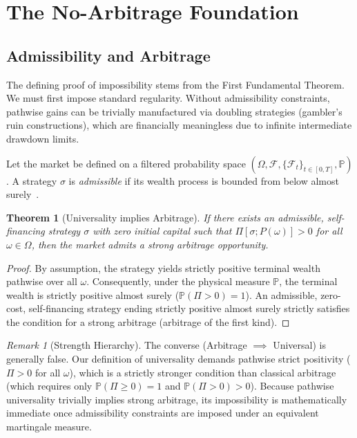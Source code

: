 \documentclass[aps,pra,reprint,superscriptaddress,amsmath,amssymb]{revtex4-2}
\theoremstyle{plain}
\newtheorem{theorem}{Theorem}
\theoremstyle{definition}
\theoremstyle{remark}
\newtheorem{remark}{Remark}
\begin{document}
\section{The No-Arbitrage Foundation}
\label{sec:noarb}

\subsection{Admissibility and Arbitrage}

The defining proof of impossibility stems from the First Fundamental Theorem. We must first impose standard regularity. Without admissibility constraints, pathwise gains can be trivially manufactured via doubling strategies (gambler's ruin constructions), which are financially meaningless due to infinite intermediate drawdown limits.

Let the market be defined on a filtered probability space $(\Omega, \mathcal{F}, \{\mathcal{F}_t\}_{t\in[0,T]}, \mathbb{P})$. A strategy $\sigma$ is \emph{admissible} if its wealth process is bounded from below almost surely~\cite{Delbaen1994}.

\begin{theorem}[Universality implies Arbitrage]
  \label{thm:arbitrage}
  If there exists an admissible, self-financing strategy $\sigma$ with zero initial capital such that $\Pi[\sigma;P(\omega)]>0$ for all $\omega \in \Omega$, then the market admits a strong arbitrage opportunity.
\end{theorem}

\begin{proof}
  By assumption, the strategy yields strictly positive terminal wealth pathwise over all $\omega$. Consequently, under the physical measure $\mathbb{P}$, the terminal wealth is strictly positive almost surely ($\mathbb{P}(\Pi > 0) = 1$). An admissible, zero-cost, self-financing strategy ending strictly positive almost surely strictly satisfies the condition for a strong arbitrage (arbitrage of the first kind).
\end{proof}

\begin{remark}[Strength Hierarchy]
  The converse (Arbitrage $\implies$ Universal) is generally false. Our definition of universality demands pathwise strict positivity ($\Pi>0$ for all $\omega$), which is a strictly stronger condition than classical arbitrage (which requires only $\mathbb{P}(\Pi \geq 0) = 1$ and $\mathbb{P}(\Pi > 0) > 0$). Because pathwise universality trivially implies strong arbitrage, its impossibility is mathematically immediate once admissibility constraints are imposed under an equivalent martingale measure.
\end{remark}
\end{document}
